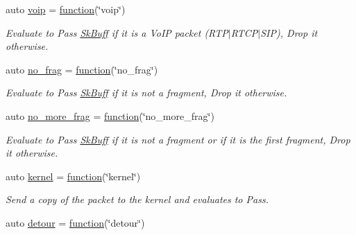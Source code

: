 \begin{DoxyCompactItemize}
auto \hyperlink{namespacepfq_1_1lang_1_1anonymous__namespace_02default_8hpp_03_a814df3093ef905eedf9a9add4c625147}{voip} = \hyperlink{namespacepfq_1_1lang_a1a4638059d700ae08d0ca63886ff2bb3}{function}(\char`\"{}voip\char`\"{})
\begin{DoxyCompactList}\small\item\em Evaluate to {\ttfamily Pass} \hyperlink{structpfq_1_1lang_1_1SkBuff}{Sk\+Buff} if it is a Vo\+IP packet (R\+T\+P$\vert$\+R\+T\+C\+P$\vert$\+S\+IP), {\ttfamily Drop} it otherwise. \end{DoxyCompactList}\item 
auto \hyperlink{namespacepfq_1_1lang_1_1anonymous__namespace_02default_8hpp_03_a4cfaf018f687a1563161b8f4245a6652}{no\+\_\+frag} = \hyperlink{namespacepfq_1_1lang_a1a4638059d700ae08d0ca63886ff2bb3}{function}(\char`\"{}no\+\_\+frag\char`\"{})
\begin{DoxyCompactList}\small\item\em Evaluate to {\ttfamily Pass} \hyperlink{structpfq_1_1lang_1_1SkBuff}{Sk\+Buff} if it is not a fragment, {\ttfamily Drop} it otherwise. \end{DoxyCompactList}\item 
auto \hyperlink{namespacepfq_1_1lang_1_1anonymous__namespace_02default_8hpp_03_a88628ce70e2a650af1338851373b9891}{no\+\_\+more\+\_\+frag} = \hyperlink{namespacepfq_1_1lang_a1a4638059d700ae08d0ca63886ff2bb3}{function}(\char`\"{}no\+\_\+more\+\_\+frag\char`\"{})
\begin{DoxyCompactList}\small\item\em Evaluate to {\ttfamily Pass} \hyperlink{structpfq_1_1lang_1_1SkBuff}{Sk\+Buff} if it is not a fragment or if it is the first fragment, {\ttfamily Drop} it otherwise. \end{DoxyCompactList}\item 
auto \hyperlink{namespacepfq_1_1lang_1_1anonymous__namespace_02default_8hpp_03_a93294225145f96c6aa6cf0cedfa19103}{kernel} = \hyperlink{namespacepfq_1_1lang_a1a4638059d700ae08d0ca63886ff2bb3}{function}(\char`\"{}kernel\char`\"{})
\begin{DoxyCompactList}\small\item\em Send a copy of the packet to the kernel and evaluates to {\ttfamily Pass}. \end{DoxyCompactList}\item 
auto \hyperlink{namespacepfq_1_1lang_1_1anonymous__namespace_02default_8hpp_03_ac8ba4f5ff06c1e099ac888ba4faa697a}{detour} = \hyperlink{namespacepfq_1_1lang_a1a4638059d700ae08d0ca63886ff2bb3}{function}(\char`\"{}detour\char`\"{})

\end{DoxyCompactItemize}
